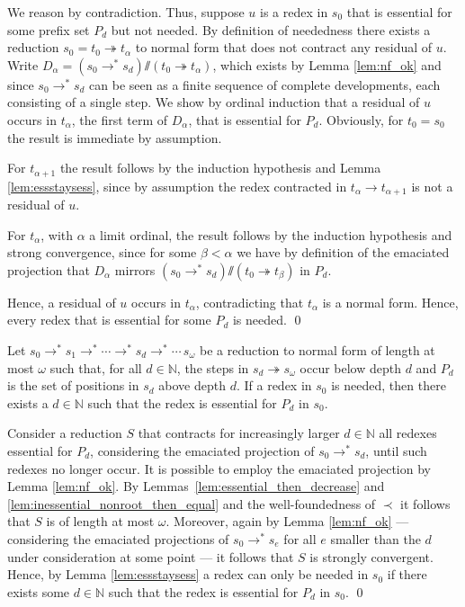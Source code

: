 \documentclass{LMCS}
\theoremstyle{definition}
\newcommand{\rew}{\rightarrow}
\newcommand{\rewt}{\rightarrow^*}
\newcommand{\trewt}{\twoheadrightarrow}
\newcommand{\emmy}{\mathord{\sslash}}
\newcommand{\natnum}{\mathbb{N}}
\begin{document}
\proof
We reason by contradiction. Thus, suppose $u$ is a redex in $s_0$ that is essential for some prefix set $P_d$ but not needed. By definition of neededness there exists a reduction $s_0 = t_0 \trewt t_\alpha$ to normal form that does not contract any residual of $u$. Write $D_\alpha = (s_0 \rewt s_d) \emmy (t_0 \trewt t_\alpha)$, which exists by Lemma \ref{lem:nf_ok} and since $s_0 \rewt s_d$ can be seen as a finite sequence of complete developments, each consisting of a single step. We show by ordinal induction that a residual of $u$ occurs in $t_\alpha$, the first term of $D_\alpha$, that is essential for $P_d$. Obviously, for $t_0 = s_0$ the result is immediate by assumption.

For $t_{\alpha + 1}$ the result follows by the induction hypothesis and Lemma \ref{lem:essstaysess}, since by assumption the redex contracted in $t_\alpha \rew t_{\alpha + 1}$ is not a residual of $u$.

For $t_\alpha$, with $\alpha$ a limit ordinal, the result follows by the induction hypothesis and strong convergence, since for some $\beta < \alpha$ we have by definition of the emaciated projection that $D_\alpha$ mirrors $(s_0 \rewt s_d) \emmy (t_0 \trewt t_\beta)$ in $P_d$.

Hence, a residual of $u$ occurs in $t_\alpha$, contradicting that $t_\alpha$ is a normal form. Hence, every redex that is essential for some $P_d$ is needed.
\qed

\begin{lem}
Let $s_0 \rewt s_1 \rewt \cdots \rewt s_d \rewt \cdots \, s_\omega$ be a reduction to normal form of length at most $\omega$ such that, for all $d \in \natnum$, the steps in $s_d \trewt s_\omega$ occur below depth $d$ and $P_d$ is the set of positions in $s_d$ above depth $d$. If a redex in $s_0$ is needed, then there exists a $d \in \natnum$ such that the redex is essential for $P_d$ in $s_0$.
\end{lem}

\proof
Consider a reduction $S$ that contracts for increasingly larger $d \in \natnum$ all redexes essential for $P_d$, considering the emaciated projection of $s_0 \rewt s_d$, until such redexes no longer occur. It is possible to employ the emaciated projection by Lemma \ref{lem:nf_ok}. By Lemmas~\ref{lem:essential_then_decrease} and \ref{lem:inessential_nonroot_then_equal} and the well-foundedness of $\prec$ it follows that $S$ is of length at most $\omega$. Moreover, again by Lemma \ref{lem:nf_ok} --- considering the emaciated projections of $s_0 \rewt s_e$ for all $e$ smaller than the $d$ under consideration at some point --- it follows that $S$ is strongly convergent. Hence, by Lemma \ref{lem:essstaysess} a redex can only be needed in $s_0$ if there exists some $d \in \natnum$ such that the redex is essential for $P_d$ in $s_0$.
\qed
\end{document}
